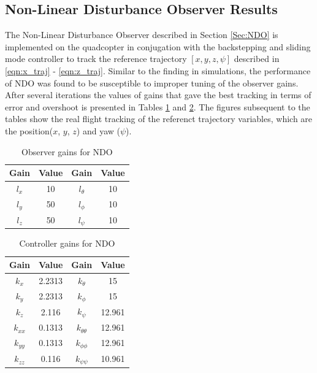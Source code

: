 \documentclass[letterpaper%
, twoside%
, 12pt%
,memoire%
, english%
,creativecommons,hyperref%
]{thETS}
\theoremstyle{newThmStyle}
\begin{document}
\subsection{Non-Linear Disturbance Observer Results}
The Non-Linear Disturbance Observer described in Section \ref{Sec:NDO} is implemented on the quadcopter in conjugation with the backstepping and sliding mode controller to track the reference trajectory $[x,y,z,\psi]$ described in \eqref{eqn:x_traj} - \eqref{eqn:z_traj}. Similar to the finding in simulations, the performance of NDO was found to be susceptible to improper tuning of the observer gains. After several iterations the values of gains that gave the best tracking in terms of error and overshoot is presented in Tables \ref{Tab:realNDOGains} and \ref{Tab:realControllerGains}. The figures subsequent to the tables show the real flight tracking of the referenct trajectory variables, which are the position($x$, $y$, $z$) and yaw ($\psi$). 
\begin{table}
\parbox{0.65\textwidth}{\caption{Observer gains for NDO}\label{Tab:realNDOGains}}
\begin{tabular}{|c|c|c|c|}
\hline
{\bf Gain}&{\bf Value}&{\bf Gain}&{\bf Value}\\ \hline
$l_x$ & 10 & $l_\theta$  & 10  \\ \hline
$l_y$ & 50 & $l_\phi$    & 10  \\ \hline
$l_z$ & 50 & $l_\psi$    & 10  \\ \hline 
\end{tabular}
\end{table}

\begin{table}
\parbox{0.65\textwidth}{\caption{Controller gains for NDO}\label{Tab:realControllerGains}} 
\begin{tabular}{|c|c|c|c|}
\hline
{\bf Gain} & {\bf Value} & {\bf Gain}         & {\bf Value}  \\ \hline
$k_x$      & 2.2313      & $k_\theta$         & 15           \\ \hline
$k_y$      & 2.2313      & $k_\phi$           & 15           \\ \hline
$k_z$      & 2.116       & $k_\psi$           & 12.961       \\ \hline 
$k_{xx}$   & 0.1313      & $k_{\theta\theta}$ & 12.961       \\ \hline
$k_{yy}$   & 0.1313      & $k_{\phi\phi}$     & 12.961       \\ \hline
$k_{zz}$   & 0.116       & $k_{\psi\psi}$     & 10.961       \\ \hline 
\end{tabular}
\end{table}
\end{document}
